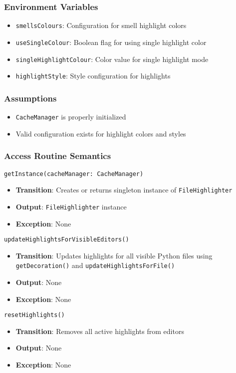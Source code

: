 \documentclass[12pt, titlepage]{article}
\begin{document}
\subsubsection{Environment Variables}
\begin{itemize}
\item \texttt{smellsColours}: Configuration for smell highlight colors
\item \texttt{useSingleColour}: Boolean flag for using single highlight color
\item \texttt{singleHighlightColour}: Color value for single highlight mode
\item \texttt{highlightStyle}: Style configuration for highlights
\end{itemize}

\subsubsection{Assumptions}
\begin{itemize}
\item \texttt{CacheManager} is properly initialized
\item Valid configuration exists for highlight colors and styles
\end{itemize}

\subsubsection{Access Routine Semantics}
\texttt{getInstance(cacheManager: CacheManager)}
\begin{itemize}
\item \textbf{Transition}: Creates or returns singleton instance of \texttt{FileHighlighter}
\item \textbf{Output}: \texttt{FileHighlighter} instance
\item \textbf{Exception}: None
\end{itemize}

\texttt{updateHighlightsForVisibleEditors()}
\begin{itemize}
\item \textbf{Transition}: Updates highlights for all visible Python files using \texttt{getDecoration()} and \texttt{updateHighlightsForFile()}
\item \textbf{Output}: None
\item \textbf{Exception}: None
\end{itemize}

\texttt{resetHighlights()}
\begin{itemize}
\item \textbf{Transition}: Removes all active highlights from editors
\item \textbf{Output}: None
\item \textbf{Exception}: None
\end{itemize}
\end{document}
